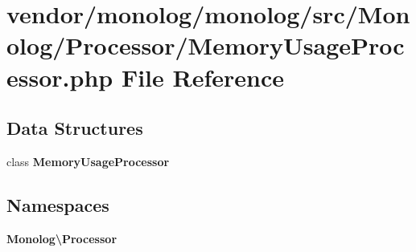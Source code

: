 \section{vendor/monolog/monolog/src/\+Monolog/\+Processor/\+Memory\+Usage\+Processor.php File Reference}
\label{_memory_usage_processor_8php}
\subsection*{Data Structures}
\begin{DoxyCompactItemize}
\item 
class {\bf Memory\+Usage\+Processor}
\end{DoxyCompactItemize}
\subsection*{Namespaces}
\begin{DoxyCompactItemize}
\item 
 {\bf Monolog\textbackslash{}\+Processor}
\end{DoxyCompactItemize}
